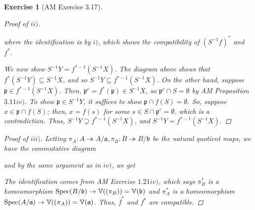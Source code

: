 \documentclass[12pt,letterpaper]{article}
\newtheorem{problem}{Exercise}[section]
\theoremstyle{definition}
\theoremstyle{remark}
\numberwithin{figure}{problem}
\numberwithin{equation}{section}
\DeclareMathOperator{\Spec}{Spec}
\let\ker\relax
\DeclareMathOperator{\ker}{Ker}
\begin{document}
\begin{problem} [AM Exercise 3.17]
\begin{proof}[Proof of $ii)$]
  \begin{center}
  \end{center}
  where the identification is by $i)$, which shows the compatibility of $(S^{-1}f)^*$ and $f^*$.
  \par We now show $S^{-1}Y = f^{*-1}(S^{-1}X)$. The diagram above shows that $f^*(S^{-1}Y) \subseteq S^{-1}X$, and so $S^{-1}Y \subseteq f^{*-1}(S^{-1}X)$. On the other hand, suppose $\mathfrak{p} \in f^{*-1}(S^{-1}X)$. Then, $\mathfrak{p}^c = f^*(\mathfrak{p}) \in S^{-1}X$, so $\mathfrak{p}^c \cap S = \emptyset$ by AM Proposition $3.11iv)$. To show $\mathfrak{p} \in S^{-1}Y$, it suffices to show $\mathfrak{p} \cap f(S) = \emptyset$. So, suppose $x \in \mathfrak{p} \cap f(S)$; then, $x = f(s)$ for some $s \in S \cap \mathfrak{p}^c = \emptyset$, which is a contradiction. Thus, $S^{-1}Y \supseteq f^{*-1}(S^{-1}X)$, and $S^{-1}Y = f^{*-1}(S^{-1}X)$.
\end{proof}
\begin{proof}[Proof of $iii)$]
  Letting $\pi_A : A \twoheadrightarrow A/\mathfrak{a},\pi_B : B \twoheadrightarrow B/\mathfrak{b}$ be the natural quotient maps, we have the commutative diagram
  \begin{center}
  \end{center}
  and by the same argument as in $iv)$, we get
  \begin{center}
  \end{center}
  The identification comes from AM Exercise $1.21iv)$, which says $\pi_B^*$ is a homeomorphism $\Spec(B/\mathfrak{b}) \to \mathbb{V}(\ker(\pi_B)) = \mathbb{V}(\mathfrak{b})$ and $\pi_A^*$ is a homeomorphism $\Spec(A/\mathfrak{a}) \to \mathbb{V}(\ker(\pi_A)) = \mathbb{V}(\mathfrak{a})$. Thus, $\overline{f}^*$ and $f^*$ are compatible.

\end{proof}
\end{problem}
\end{document}
